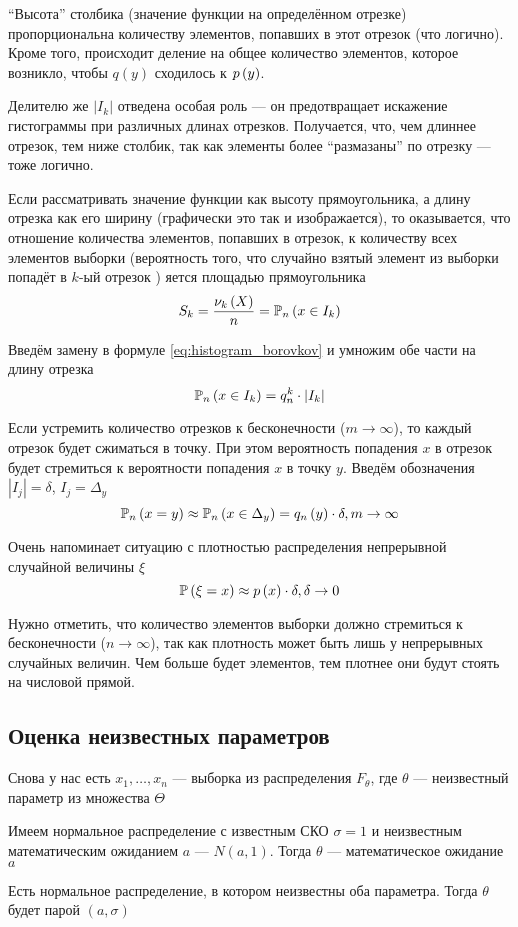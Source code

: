 ``Высота'' столбика (значение функции на определённом отрезке)
пропорциональна количеству элементов, попавших в этот отрезок (что логично).
Кроме того, происходит деление на общее количество элементов,
которое возникло, чтобы $q\left(y\right)$ сходилось к $p\left(y\right)$.

Делителю же $\left|I_k\right|$ отведена особая роль --- он предотвращает
искажение гистограммы при различных длинах отрезков.
Получается, что, чем длиннее отрезок, тем ниже столбик,
так как элементы более ``размазаны'' по отрезку --- тоже логично.

Если рассматривать значение функции как высоту прямоугольника,
а длину отрезка как его ширину (графически это так и изображается),
то оказывается, что отношение количества элементов, попавших в отрезок,
к количеству всех элементов выборки
(вероятность того,
что случайно взятый элемент из выборки попадёт в $k$-ый отрезок \cite[стр.~24]{BorovkovMS})
яется площадью прямоугольника
$$S_k=\frac{\nu_k\left(X\right)}{n}=\mathbb{P}_n\left( x\in I_k \right)$$

Введём замену в формуле \eqref{eq:histogram_borovkov}
и умножим обе части на длину отрезка
$$\mathbb{P}_n\left( x\in I_k \right)=q_n^k\cdot\left|I_k\right|$$

Если устремить количество отрезков к бесконечности ($m\to\infty$),
то каждый отрезок будет сжиматься в точку.
При этом вероятность попадения $x$ в отрезок будет стремиться
к вероятности попадения $x$ в точку $y$.
Введём обозначения $|I_j|=\delta$, $I_j=\Delta_y$
$$\mathbb{P}_n\left( x=y \right)
\approx\mathbb{P}_n\left( x\in\Delta_y \right)=q_n\left(y\right)\cdot\delta, m\to\infty$$

Очень напоминает ситуацию с плотностью распределения
непрерывной случайной величины $\xi$
$$\mathbb{P}\left( \xi=x \right)\approx p\left(x\right)\cdot\delta, \delta\to 0$$

Нужно отметить,
что количество элементов выборки
должно стремиться к бесконечности ($n\to\infty$),
так как плотность может быть лишь у непрерывных случайных величин.
Чем больше будет элементов,
тем плотнее они будут стоять на числовой прямой.

\subsection{Оценка неизвестных параметров}
Снова у нас есть $x_1, \dots, x_n$ --- выборка из распределения $F_\theta$,
где $\theta$ --- неизвестный параметр из множества $\Theta$

\begin{example}Имеем нормальное распределение с известным СКО $\sigma=1$
    и неизвестным математическим ожиданием $a$ --- $N\left(a,1\right)$.
    Тогда $\theta$ --- математическое ожидание $a$
\end{example}
\begin{example}Есть нормальное распределение, в котором неизвестны оба параметра.
    Тогда $\theta$ будет парой $(a,\sigma)$
\end{example}

